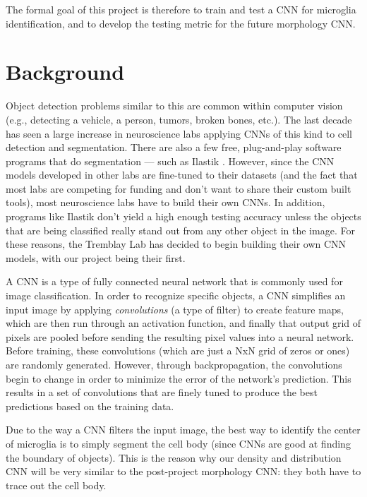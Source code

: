 \documentclass{article}
\begin{document}
The formal goal of this project is therefore to train and test a CNN for 
microglia identification, and to develop the testing metric for the future 
morphology CNN. 

\section{Background}

Object detection problems similar to this are common within computer vision 
(e.g., detecting a vehicle, a person, tumors, broken bones, etc.). The last 
decade has seen a large increase in neuroscience labs applying CNNs of this 
kind to cell detection and segmentation. There are also a few free, 
plug-and-play software programs that do segmentation — such as 
Ilastik \parencite{ilastik}. However, since the CNN models developed in other 
labs are fine-tuned to their datasets (and the fact that most labs are 
competing for funding and don't want to share their custom built tools), most 
neuroscience labs have to build their own CNNs. In addition, programs like 
Ilastik don't yield a high enough testing accuracy unless the objects that 
are being classified really stand out from any other object in the image. For 
these reasons, the Tremblay Lab has decided to begin building their own CNN 
models, with our project being their first.

A CNN is a type of fully connected neural network that is commonly used for 
image classification. In order to recognize specific objects, a CNN 
simplifies an input image by applying \textit{convolutions} (a type of filter)
to create feature maps, which are then run through an activation function, 
and finally that output grid of pixels are pooled before sending the 
resulting pixel values into a neural network. Before training, these 
convolutions (which are just a NxN grid of zeros or ones) are randomly 
generated. However, through backpropagation, the convolutions begin to change 
in order to minimize the error of the network's prediction. This results in a 
set of convolutions that are finely tuned to produce the best predictions 
based on the training data. 

Due to the way a CNN filters the input image, the best way to identify the 
center of microglia is to simply segment the cell body (since CNNs are good 
at finding the boundary of objects). This is the reason why our density and 
distribution CNN will be very similar to the post-project morphology CNN: 
they both have to trace out the cell body.
\end{document}
